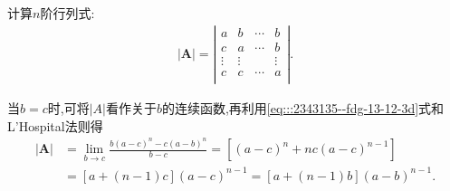 \documentclass[../../main.tex]{subfiles}
\begin{document}
\begin{proposition}\label{proposition:常见行列式1}
计算$n$阶行列式:
\begin{align*}
|\boldsymbol{A}|=\left| \begin{matrix}
a&		b&		\cdots&		b\\
c&		a&		\cdots&		b\\
\vdots&		\vdots&		&		\vdots\\
c&		c&		\cdots&		a\\
\end{matrix} \right|.
\end{align*}
\end{proposition}
\begin{remark}
当$b=c$时,可将$|A|$看作关于$b$的连续函数,再利用\eqref{eq:::2343135--fdg-13-12-3d}式和L'Hospital法则得
\begin{align*}
\left| \boldsymbol{A} \right|&=\underset{b\rightarrow c}{\lim}\frac{b\left( a-c \right) ^n-c\left( a-b \right) ^n}{b-c}=\left[ \left( a-c \right) ^n+nc\left( a-c \right) ^{n-1} \right] 
\\
&=\left[ a+\left( n-1 \right) c \right] \left( a-c \right) ^{n-1}=\left[ a+\left( n-1 \right) b \right] \left( a-b \right) ^{n-1}.
\end{align*}
\end{remark}
\end{document}
